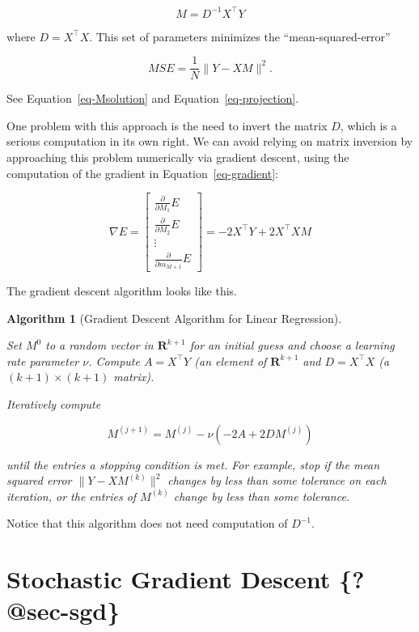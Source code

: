 \documentclass[
  11pt,
  letterpaper,
]{scrbook}
\newcommand{\df}[1]{\frac{\partial}{\partial #1}}
\newcommand{\R}{\mathbf{R}}
\theoremstyle{plain}
\newtheorem{algorithm}{Algorithm}[chapter]
\theoremstyle{plain}
\theoremstyle{remark}
\begin{document}
\[
M=D^{-1}X^{\intercal}Y
\]

where \(D=X^{\intercal}X\). This set of parameters minimizes the
``mean-squared-error''

\[
MSE = \frac{1}{N}\| Y-XM \|^2.
\]

See Equation~\ref{eq-Msolution} and Equation~\ref{eq-projection}.

One problem with this approach is the need to invert the matrix \(D\),
which is a serious computation in its own right. We can avoid relying on
matrix inversion by approaching this problem numerically via gradient
descent, using the computation of the gradient in
Equation~\ref{eq-gradient}:

\[ 
\nabla E = \left[\begin{matrix} \df{M_1}E \\ \df{M_2}E \\ \vdots \\
\df{m_{M+1}}E\end{matrix}\right] = -2 X^{\intercal}Y + 2
X^{\intercal}XM 
\]

The gradient descent algorithm looks like this.

\leavevmode{}%
\begin{algorithm}[Gradient Descent Algorithm for Linear
Regression]\label{alg-graddescentLinearRegression}

Set \(M^{0}\) to a random vector in \(\R^{k+1}\) for an initial guess
and choose a learning rate parameter \(\nu\). Compute
\(A=X^{\intercal}Y\) (an element of \(\R^{k+1}\) and
\(D=X^{\intercal}X\) (a \((k+1)\times (k+1)\) matrix).

Iteratively compute

\[
M^{(j+1)}=M^{(j)}-\nu(-2A+2DM^{(j)})
\]

until the entries a stopping condition is met. For example, stop if the
mean squared error \(\|Y-XM^{(k)}\|^2\) changes by less than some
tolerance on each iteration, or the entries of \(M^{(k)}\) change by
less than some tolerance.

\end{algorithm}

Notice that this algorithm does not need computation of \(D^{-1}\).

\hypertarget{stochastic-gradient-descent-sec-sgd}{%
\section{\texorpdfstring{Stochastic Gradient Descent
\{\textbf{?@sec-sgd}\}}{Stochastic Gradient Descent \{?@sec-sgd\}}}\label{stochastic-gradient-descent-sec-sgd}}
\end{document}
